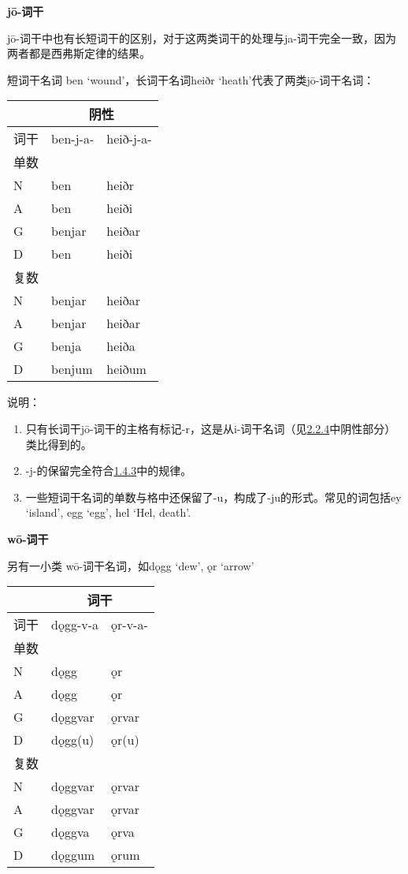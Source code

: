 \textbf{jō-词干}

jō-词干中也有长短词干的区别，对于这两类词干的处理与ja-词干完全一致，因为两者都是西弗斯定律的结果。

短词干名词 ben `wound'，长词干名词heiðr `heath'代表了两类jō-词干名词：

\begin{longtable}{lll}
\toprule
 &\multicolumn{2}{c}{阴性} \\
\midrule
\endhead
\bottomrule
\endfoot
词干 & ben-j-a- & heið-j-a- \\
单数 & & \\
N & ben & heiðr \\
A & ben & heiði \\
G & benjar & heiðar \\
D & ben & heiði \\
复数 & & \\
N & benjar & heiðar \\
A & benjar & heiðar \\
G & benja & heiða \\
D & benjum & heiðum \\
\end{longtable}

说明：

\begin{enumerate}
\def\labelenumi{\arabic{enumi})}
\item
  只有长词干jō-词干的主格有标记-r，这是从i-词干名词（见\hyperref[_Ref115770706]{2.2.4}中阴性部分）类比得到的。
\item
  -j-的保留完全符合\hyperref[ux534aux5143ux97f3ux7684ux4fddux6301ux6027]{1.4.3}中的规律。
\item
  一些短词干名词的单数与格中还保留了-u，构成了-ju的形式。常见的词包括ey
  `island', egg `egg', hel `Hel, death'.
\end{enumerate}

\textbf{wō-词干}

另有一小类 wō-词干名词，如dǫgg `dew', ǫr `arrow'

\begin{longtable}{lll}
\toprule
 &\multicolumn{2}{c}{词干} \\
\midrule
\endhead
\bottomrule
\endfoot
词干 & dǫgg-v-a & ǫr-v-a- \\
单数 & & \\
N & dǫgg & ǫr \\
A & dǫgg & ǫr \\
G & dǫggvar & ǫrvar \\
D & dǫgg(u) & ǫr(u) \\
复数 & & \\
N & dǫggvar & ǫrvar \\
A & dǫggvar & ǫrvar \\
G & dǫggva & ǫrva \\
D & dǫggum & ǫrum \\
\end{longtable}

